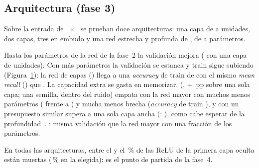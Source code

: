\subsection{Arquitectura (fase 3)}
Sobre la entrada de ~$\times$~ se prueban doce arquitecturas: una capa de
 a  unidades, dos capas, tres en embudo y una red estrecha y profunda de
, de  a  parámetros.

{Hasta los  parámetros de la red de la fase~2 la validación mejora ( con
una capa de  unidades). Con más parámetros la validación se estanca y train sigue subiendo
(Figura~\ref{fig:capacity}): la red de  capas () llega a una
\emph{accuracy} de train de  con el mismo \emph{mean recall} () que
. La capacidad extra se gasta en memorizar.}
{ (, +~pp sobre una sola capa; una semilla, dentro del
ruido) empata con la red mayor con muchos menos parámetros ( frente a ) y
mucha menos brecha (\emph{accuracy} de train ), y con un presupuesto similar supera a una sola
capa ancha (: ), como cabe esperar de la profundidad~\cite{goodfellow}.}
{: misma validación que la red mayor con una fracción de los parámetros.}

En todas las arquitecturas, entre el  y el \,\% de las ReLU de la primera
capa oculta están muertas (\,\% en la elegida): es el punto de partida de la fase~4.

\begin{figure}[!htbp]
  \centering
  \begin{minipage}[t]{0.485\linewidth}
    \centering
    \caption{}
    \label{fig:resolution}
  \end{minipage}\hfill
  \begin{minipage}[t]{0.485\linewidth}
    \centering
    \caption{}
    \label{fig:capacity}
  \end{minipage}
\end{figure}

